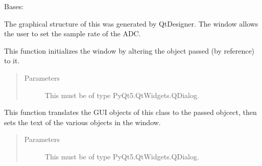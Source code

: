 \documentclass[letterpaper,10pt,english]{sphinxmanual}
\begin{document}
\begin{fulllineitems}
\label{\detokenize{sampRateGUI:sampRateGUI.Ui_Dialog}}
Bases: 

The graphical structure of this  was generated by QtDesigner.
The window allows the user to set the sample rate of the ADC.

\begin{fulllineitems}
\label{\detokenize{sampRateGUI:sampRateGUI.Ui_Dialog.setupUi}}
This function initializes the window by altering the  object passed (by reference) to it.
\begin{quote}\begin{description}
\item[{Parameters}] \leavevmode
{} \textendash{} This must be of type PyQt5.QtWidgets.QDialog.

\end{description}\end{quote}

\end{fulllineitems}


\begin{fulllineitems}
\label{\detokenize{sampRateGUI:sampRateGUI.Ui_Dialog.retranslateUi}}
This function translates the GUI objects of this class to the passed  objcect,
then sets the text of the various objects in the window.
\begin{quote}\begin{description}
\item[{Parameters}] \leavevmode
{} \textendash{} This must be of type PyQt5.QtWidgets.QDialog.

\end{description}\end{quote}


\end{fulllineitems}
\end{fulllineitems}
\end{document}
